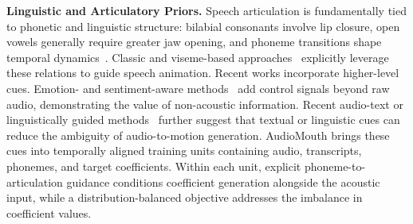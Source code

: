 \noindent\textbf{Linguistic and Articulatory Priors.}
Speech articulation is fundamentally tied to phonetic and linguistic structure: bilabial consonants involve lip closure, open vowels generally require greater jaw opening, and phoneme transitions shape temporal dynamics~\cite{cohen1993modeling,taylor2012dynamic,edwards2016jali}. Classic and viseme-based approaches~\cite{cohen1993modeling,edwards2016jali,taylor2017deep,zhou2018visemenet,bao2023learning} explicitly leverage these relations to guide speech animation.
Recent works incorporate higher-level cues. Emotion- and sentiment-aware methods~\cite{peng2023emotalk,jin2026sentiavatar} add control signals beyond raw audio, demonstrating the value of non-acoustic information. Recent audio-text or linguistically guided methods~\cite{fan2022joint,xu2024kmtalk} further suggest that textual or linguistic cues can reduce the ambiguity of audio-to-motion generation.
AudioMouth brings these cues into temporally aligned training units containing audio, transcripts, phonemes, and target coefficients. Within each unit, explicit phoneme-to-articulation guidance conditions coefficient generation alongside the acoustic input, while a distribution-balanced objective addresses the imbalance in coefficient values.
